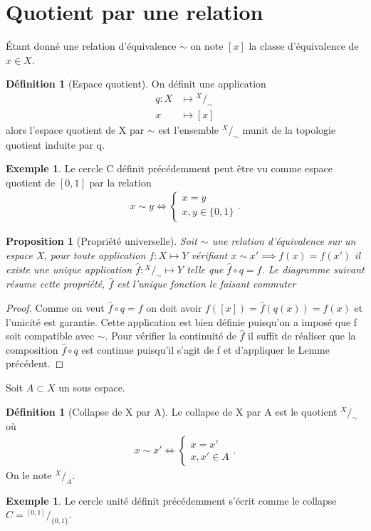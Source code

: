 \documentclass[12pt]{book}
\newtheorem{prop}[lemma]{Proposition}
\theoremstyle{definition}
\newtheorem{definition}[lemma]{Définition}
\newtheorem{example}[lemma]{Exemple}
\theoremstyle{remark}
\newcommand*\quot[2]{{^{\textstyle #1}\big/_{\textstyle #2}}}
\begin{document}
	\section{Quotient par une relation}
	Étant donné une relation d'équivalence $\sim$ on note $[x]$ la classe d'équivalence de  $x \in X$.
	\begin{definition}[Espace quotient]
		On définit une application
		\begin{align*}
			q : X &\longmapsto \quot{X}{\sim} \\
			x &\longmapsto [x]
		\end{align*}
		alors l'espace quotient de X par $\sim$ est l'ensemble $\quot{X}{\sim}$ munit de la topologie quotient induite par q.
	\end{definition}
	\begin{example}
		Le cercle C définit précédemment peut être vu comme espace quotient de $[0,1]$ par la relation 
		 \begin{align*}
			x \sim y \iff \begin{cases}
				x = y \\
				x,y \in \{0,1\}
			\end{cases}
		.\end{align*}
	\end{example}
	\begin{prop}[Propriété universelle]
		Soit $\sim$ une relation d'équivalence sur un espace X, pour toute application $f : X \longmapsto Y$ vérifiant $x \sim x' \implies f(x) = f(x')$ il existe une unique application $\hat{f} : \quot{X}{\sim} \longmapsto Y$ telle que $\hat{f} \circ q = f$.
		Le diagramme suivant résume cette propriété, $\hat{f}$ est l'unique fonction le faisant commuter 

	\end{prop}
	\begin{proof}
			Comme on veut $\hat{f}\circ q = f$ on doit avoir $f([x]) = \hat{f}(q(x)) = f(x)$ et l'unicité est garantie. Cette application est bien définie puisqu'on a imposé que f soit compatible avec $\sim$. Pour vérifier la continuité de $\hat{f}$ il suffit de réaliser que la composition $\hat{f} \circ q$ est continue puisqu'il s'agit de f et d'appliquer le Lemme précédent. 

	\end{proof}
	Soit $A\subset X$ un sous espace.
	\begin{definition}[Collapse de X par A]
		Le collapse de X par A est le quotient $\quot{X}{\sim}$ où
		 \begin{align*}
			x \sim x' \iff \begin{cases}
				x=x' \\
				x,x' \in A
			\end{cases}
		.\end{align*}
		On le note $\quot{X}{A}$.
	\end{definition}
	\begin{example}
		Le cercle unité définit précédemment s'écrit comme le collapse $C = \quot{[0,1]}{\{0,1\}}$.
	\end{example}
\end{document}
